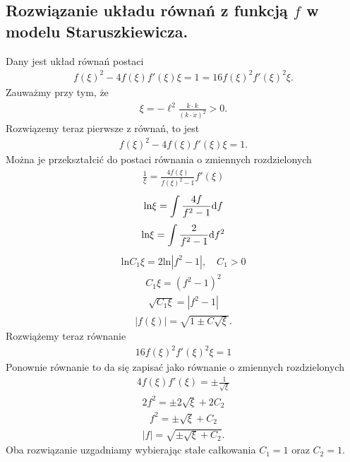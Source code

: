 \subsection{Rozwiązanie układu równań z 
funkcją $f$ w modelu Staruszkiewicza.}
\noindent
Dany jest układ równań postaci 
\begin{align*} 
 f(\xi)^2- 4 f(\xi) f'(\xi) \xi
 =  1 =
  16   f(\xi)^2 f'(\xi)^2 \xi .
\end{align*}
Zauważmy przy tym, że 
\begin{align*}
\xi = - \ell^2 \frac{\dot{k} \cdot \dot{k}}{ ( k \cdot \dot{x})^2 } > 0.
\end{align*}
Rozwiązemy teraz pierwsze z równań, to jest
\begin{align*} 
 f(\xi)^2- 4 f(\xi) f'(\xi) \xi =  1 .
\end{align*}
Można je przekształcić do postaci równania o zmiennych 
rozdzielonych
\begin{align*} 
\frac{1}{\xi} = \frac{ 4 f(\xi) }{ f(\xi)^2-1} f'(\xi) 
\end{align*}
\begin{align*} 
\text{ln} \xi = \int \frac{ 4 f }{ f^2-1} \text{d} f 
\end{align*}
\begin{align*} 
\text{ln} \xi = \int \frac{ 2 }{ f^2-1} \text{d} f^2 
\end{align*}
\begin{align*} 
\text{ln} C_1 \xi = 2\text{ln}|f^2-1|, \quad C_1>0
\end{align*}
\begin{align*} 
 C_1 \xi  = (f^2-1)^2 
\end{align*}
\begin{align*} 
 \sqrt{ C_1 \xi}  = | f^2-1 | 
\end{align*}
\begin{align*} 
|f(\xi)| =  \sqrt{ 1 \pm C\sqrt{ \xi} }. 
\end{align*}
Rozwiążemy teraz równanie
\begin{align*} 
  16   f(\xi)^2 f'(\xi)^2 \xi  = 1
\end{align*}
Ponownie równanie to da się zapisać jako równanie o 
zmiennych rozdzielonych
\begin{align*} 
  4  f(\xi) f'(\xi)   =\pm \frac{1}{\sqrt{\xi}}
\end{align*}
\begin{align*} 
  2 f^2   =\pm 2 \sqrt{\xi} + 2 C_2
\end{align*}
\begin{align*} 
   f^2   =\pm  \sqrt{\xi} + C_2
\end{align*}
\begin{align*} 
   |f|   =\sqrt{ \pm  \sqrt{\xi} + C_2 }.
\end{align*}
Oba rozwiązanie uzgadniamy wybierając 
stałe całkowania $C_1 = 1$ oraz $C_2=1$.



